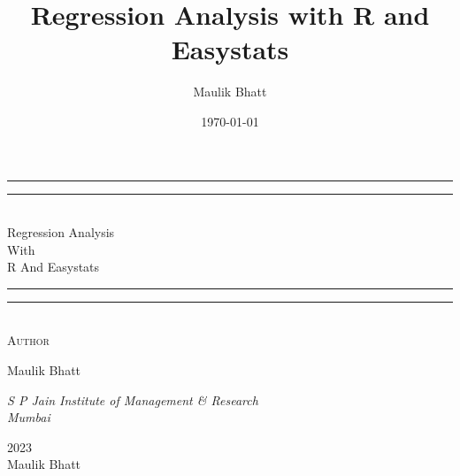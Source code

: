 \documentclass[]{scrbook}
\title{Regression Analysis with R and Easystats}
\author{Maulik Bhatt}
\date{\today}
\begin{document}
\begin{titlepage}
	\centering
	\vspace*{\baselineskip}
	\rule{\textwidth}{1.6pt}\vspace*{-\baselineskip}\vspace*{2pt}
	\rule{\textwidth}{0.4pt}\\[\baselineskip]
	{\LARGE Regression Analysis\\ With \\[0.3\baselineskip] R And Easystats}\\[0.2\baselineskip]
	\rule{\textwidth}{0.4pt}\vspace*{-\baselineskip}\vspace{3.2pt}
	\rule{\textwidth}{1.6pt}\\[\baselineskip]
	\scshape
	\vspace*{8\baselineskip}
	Author \\[\baselineskip]
	{\Large Maulik Bhatt \par}
	{\itshape S P Jain Institute of Management \& Research \\ Mumbai\par}
	\vfill
	{\scshape 2023} \\
	{\large Maulik Bhatt}\par%
    \end{titlepage}
	
\end{document}
